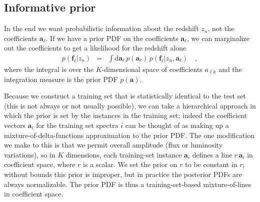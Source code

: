 \documentclass[apj]{emulateapj}
\newcommand{\mmatrix}[1]{\boldsymbol{#1}}
\newcommand{\avec}{\mmatrix{a}}
\newcommand{\fvec}{\mmatrix{f}}
\newcommand{\dd}{\mathrm{d}}
\begin{document}
\subsection{Informative prior}

In the end we want probabilistic information about the redshift $z_n$,
not the coefficients $\avec_\ell$.  If we have a prior PDF on the
coefficients $\avec_\ell$, we can marginalize out the coefficients to
get a likelihood for the redshift alone
\begin{eqnarray}\displaystyle
p(\fvec_\ell|z_n) &=& \int \dd\avec_\ell\,p(\avec_\ell)\,p(\fvec_\ell|z_n,\avec_\ell)
\quad ,
\end{eqnarray}
where the integral is over the $K$-dimensional space of coefficients
$a_{\ell k}$ and the integration measure is the prior PDF $p(\avec)$.

Because we construct a training set that is statistically identical to
the test set (this is not always or not usually possible), we can take
a hierarchical approach in which the prior is set by the instances in
the training set; indeed the coefficient vectors $\avec_i$ for the
training set spectra $i$ can be thought of as making up a
mixture-of-delta-functions approximation to the prior PDF.  The one
modification we make to this is that we permit overall amplitude (flux
or luminosity variations), so in $K$ dimensions, each training-set
instance $\avec_i$ defines a line $r\,\avec_i$ in coefficient space,
where $r$ is a scalar.  We set the prior on $r$ to be constant in $r$;
without bounds this prior is improper, but in practice the posterior
PDFs are always normalizable.  The prior PDF is thus a
training-set-based mixture-of-lines in coefficient space.
\end{document}
